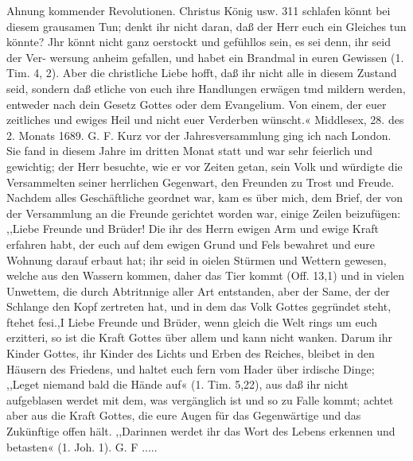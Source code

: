 Ahnung kommender Revolutionen. Christus König usw. 311
schlafen könnt bei diesem grausamen Tun; denkt ihr nicht daran,
daß der Herr euch ein Gleiches tun könnte? Jhr könnt nicht
ganz oerstockt und gefühllos sein, es sei denn, ihr seid der Ver-
wersung anheim gefallen, und habet ein Brandmal in euren
Gewissen (1. Tim. 4, 2). Aber die christliche Liebe hofft, daß ihr
nicht alle in diesem Zustand seid, sondern daß etliche von euch
ihre Handlungen erwägen tmd mildern werden, entweder nach
dein Gesetz Gottes oder dem Evangelium.
Von einem, der euer zeitliches und ewiges Heil und nicht
euer Verderben wünscht.«
Middlesex, 28. des 2. Monats 1689. G. F.
Kurz vor der Jahresversammlung ging ich nach London.
Sie fand in diesem Jahre im dritten Monat statt und war
sehr feierlich und gewichtig; der Herr besuchte, wie er vor Zeiten
getan, sein Volk und würdigte die Versammelten seiner herrlichen
Gegenwart, den Freunden zu Trost und Freude. Nachdem alles
Geschäftliche geordnet war, kam es über mich, dem Brief, der
von der Versammlung an die Freunde gerichtet worden war,
einige Zeilen beizufügen:
,,Liebe Freunde und Brüder!
Die ihr des Herrn ewigen Arm und ewige Kraft erfahren
habt, der euch auf dem ewigen Grund und Fels bewahret und
eure Wohnung darauf erbaut hat; ihr seid in oielen Stürmen
und Wettern gewesen, welche aus den Wassern kommen, daher
das Tier kommt (Off. 13,1) und in vielen Unwettem, die durch
Abtritnnige aller Art entstanden, aber der Same, der der Schlange
den Kopf zertreten hat, und in dem das Volk Gottes gegründet
steht, ftehet fesi.,I Liebe Freunde und Brüder, wenn gleich die Welt
rings um euch erzitteri, so ist die Kraft Gottes über allem und
kann nicht wanken. Darum ihr Kinder Gottes, ihr Kinder des
Lichts und Erben des Reiches, bleibet in den Häusern des
Friedens, und haltet euch fern vom Hader über irdische Dinge;
,,Leget niemand bald die Hände auf« (1. Tim. 5,22), aus daß
ihr nicht aufgeblasen werdet mit dem, was vergänglich ist und so
zu Falle kommt; achtet aber aus die Kraft Gottes, die eure Augen
für das Gegenwärtige und das Zukünftige offen hält. ,,Darinnen
werdet ihr das Wort des Lebens erkennen und betasten« (1. Joh. 1).
G. F .....


